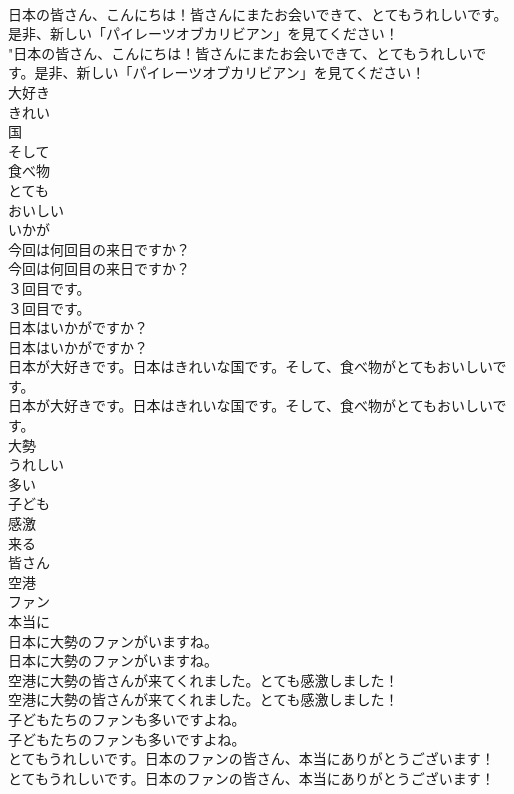 \documentclass[8pt]{extreport}
\begin{document}
\begin{CJK}{UTF8}{min}
\\	日本の皆さん、こんにちは！皆さんにまたお会いできて、とてもうれしいです。是非、新しい「パイレーツオブカリビアン」を見てください！	
\\	"日本の皆さん、こんにちは！皆さんにまたお会いできて、とてもうれしいです。是非、新しい「パイレーツオブカリビアン」を見てください！ 
\\	大好き
\\	きれい
\\	国
\\	そして
\\	食べ物
\\	とても
\\	おいしい
\\	いかが
\\	今回は何回目の来日ですか？	
\\	今回は何回目の来日ですか？ 
\\	３回目です。	
\\	３回目です。 
\\	日本はいかがですか？	
\\	日本はいかがですか？ 
\\	日本が大好きです。日本はきれいな国です。そして、食べ物がとてもおいしいです。	
\\	日本が大好きです。日本はきれいな国です。そして、食べ物がとてもおいしいです。 
\\	大勢
\\	うれしい
\\	多い
\\	子ども
\\	感激
\\	来る
\\	皆さん
\\	空港
\\	ファン
\\	本当に
\\	日本に大勢のファンがいますね。	
\\	日本に大勢のファンがいますね。 
\\	空港に大勢の皆さんが来てくれました。とても感激しました！	
\\	空港に大勢の皆さんが来てくれました。とても感激しました！ 
\\	子どもたちのファンも多いですよね。	
\\	子どもたちのファンも多いですよね。 
\\	とてもうれしいです。日本のファンの皆さん、本当にありがとうございます！	
\\	とてもうれしいです。日本のファンの皆さん、本当にありがとうございます！ 

\end{CJK}
\end{document}
